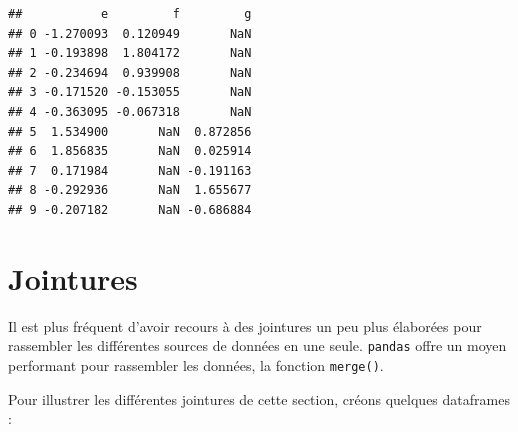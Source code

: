 \documentclass[
  12pt,
]{book}
\numberwithin{equation}{section}
\numberwithin{countremarque}{section}
\begin{document}
\begin{lstlisting}
##           e         f         g
## 0 -1.270093  0.120949       NaN
## 1 -0.193898  1.804172       NaN
## 2 -0.234694  0.939908       NaN
## 3 -0.171520 -0.153055       NaN
## 4 -0.363095 -0.067318       NaN
## 5  1.534900       NaN  0.872856
## 6  1.856835       NaN  0.025914
## 7  0.171984       NaN -0.191163
## 8 -0.292936       NaN  1.655677
## 9 -0.207182       NaN -0.686884
\end{lstlisting}

\section{Jointures}\label{pandas-jointures}

Il est plus fréquent d'avoir recours à des jointures un peu plus élaborées pour rassembler les différentes sources de données en une seule. \texttt{pandas} offre un moyen performant pour rassembler les données, la fonction \texttt{merge()}.

Pour illustrer les différentes jointures de cette section, créons quelques dataframes :
\end{document}
